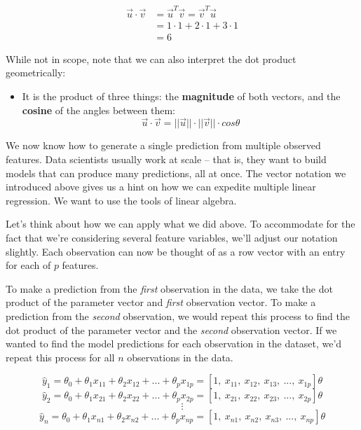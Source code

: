 \documentclass[
  letterpaper,
  DIV=11,
  numbers=noendperiod]{scrreprt}
\providecommand{\tightlist}{%
  \setlength{\itemsep}{0pt}\setlength{\parskip}{0pt}}\usepackage{longtable,booktabs,array}
\begin{document}
\begin{tcolorbox}
\begin{align}
\vec{u} \cdot \vec{v} &= \vec{u}^T \vec{v} = \vec{v}^T \vec{u} \\
  &= 1 \cdot 1 + 2 \cdot 1 + 3 \cdot 1 \\ 
  &= 6
\end{align}

While not in scope, note that we can also interpret the dot product
geometrically:

\begin{itemize}
\tightlist
\item
  It is the product of three things: the \textbf{magnitude} of both
  vectors, and the \textbf{cosine} of the angles between them:
  \[\vec{u} \cdot \vec{v} = ||\vec{u}|| \cdot ||\vec{v}|| \cdot {cos \theta}\]
\end{itemize}

\end{tcolorbox}

We now know how to generate a single prediction from multiple observed
features. Data scientists usually work at scale -- that is, they want to
build models that can produce many predictions, all at once. The vector
notation we introduced above gives us a hint on how we can expedite
multiple linear regression. We want to use the tools of linear algebra.

Let's think about how we can apply what we did above. To accommodate for
the fact that we're considering several feature variables, we'll adjust
our notation slightly. Each observation can now be thought of as a row
vector with an entry for each of \(p\) features.

To make a prediction from the \emph{first} observation in the data, we
take the dot product of the parameter vector and \emph{first}
observation vector. To make a prediction from the \emph{second}
observation, we would repeat this process to find the dot product of the
parameter vector and the \emph{second} observation vector. If we wanted
to find the model predictions for each observation in the dataset, we'd
repeat this process for all \(n\) observations in the data.

\[\hat{y}_1 = \theta_0 + \theta_1 x_{11} + \theta_2 x_{12} + ... + \theta_p x_{1p} = [1,\:x_{11},\:x_{12},\:x_{13},\:...,\:x_{1p}] \theta\]
\[\hat{y}_2 = \theta_0 + \theta_1 x_{21} + \theta_2 x_{22} + ... + \theta_p x_{2p} = [1,\:x_{21},\:x_{22},\:x_{23},\:...,\:x_{2p}] \theta\]
\[\vdots\]
\[\hat{y}_n = \theta_0 + \theta_1 x_{n1} + \theta_2 x_{n2} + ... + \theta_p x_{np} = [1,\:x_{n1},\:x_{n2},\:x_{n3},\:...,\:x_{np}] \theta\]
\end{document}
